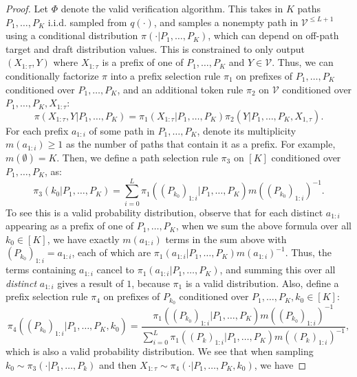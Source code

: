 \documentclass{article}
\theoremstyle{plain}
\theoremstyle{definition}
\theoremstyle{remark}
\newcommand{\V}{\mathcal{V}}
\begin{document}
\begin{proof}
    Let $\Phi$ denote the valid verification algorithm. This takes in $K$ paths $P_1,\ldots,P_K$ i.i.d. sampled from $q(\cdot)$, and samples a nonempty path in $\V^{\leq L+1}$ using a conditional distribution $\pi(\cdot|P_1,\ldots,P_K)$, which can depend on off-path target and draft distribution values. This is constrained to only output $(X_{1:\tau},Y)$ where $X_{1:\tau}$ is a prefix of one of $P_1,\ldots,P_K$ and $Y \in \V$. Thus, we can conditionally factorize $\pi$ into a prefix selection rule $\pi_1$ on prefixes of $P_1,\ldots,P_K$ conditioned over $P_1,\ldots,P_K$, and an additional token rule $\pi_2$ on $\V$ conditioned over $P_1,\ldots,P_K,X_{1:\tau}$:
    \begin{equation}
        \pi(X_{1:\tau},Y|P_1,\ldots,P_K) = \pi_1(X_{1:\tau}|P_1,\ldots,P_K)\pi_2(Y|P_1,\ldots,P_K,X_{1,\tau}).
    \end{equation}
    For each prefix $a_{1:i}$ of some path in $P_1,\ldots,P_K$, denote its multiplicity $m(a_{1:i})\geq 1$ as the number of paths that contain it as a prefix. For example, $m(\emptyset)=K$. Then, we define a path selection rule $\pi_3$ on $[K]$ conditioned over $P_1,\ldots,P_K$, as:
    \begin{equation}
        \pi_3(k_0|P_1,\ldots,P_K) = \sum_{i=0}^L \pi_1((P_{k_0})_{1:i}|P_1,\ldots,P_K)m((P_{k_0})_{1:i})^{-1}.
    \end{equation}
    To see this is a valid probability distribution, observe that for each distinct $a_{1:i}$ appearing as a prefix of one of $P_1,\ldots,P_K$, when we sum the above formula over all $k_0 \in [K]$, we have exactly $m(a_{1:i})$ terms in the sum above with $(P_{k_0})_{1:i}=a_{1:i}$, each of which are $\pi_1(a_{1:i}|P_1,\ldots,P_K)m(a_{1:i})^{-1}$. Thus, the terms containing $a_{1:i}$ cancel to $\pi_1(a_{1:i}|P_1,\ldots,P_K)$, and summing this over all \textit{distinct} $a_{1:i}$ gives a result of $1$, because $\pi_1$ is a valid distribution. Also, define a prefix selection rule $\pi_4$ on prefixes of $P_{k_0}$ conditioned over $P_1,\ldots,P_K,k_0\in [K]$:
    \begin{equation}
    \pi_4((P_{k_0})_{1:i}|P_1,\ldots,P_K,k_0) = \frac{ \pi_1((P_{k_0})_{1:i}|P_1,\ldots,P_K)m((P_{k_0})_{1:i})^{-1}}{\sum_{i=0}^L \pi_1((P_k)_{1:i}|P_1,\ldots,P_K)m((P_k)_{1:i})^{-1}},
    \end{equation}
    which is also a valid probability distribution. We see that when sampling $k_0 \sim \pi_3(\cdot|P_1,\ldots,P_k)$ and then $X_{1:\tau} \sim \pi_4(\cdot|P_1,\ldots,P_K,k_0)$, we have

\end{proof}
\end{document}
